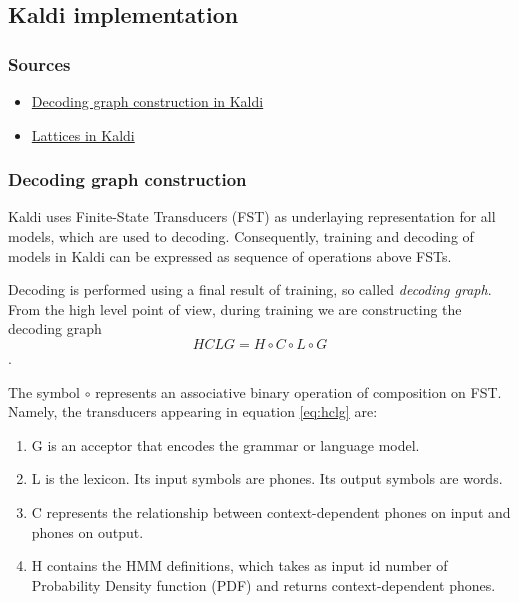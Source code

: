 
\subsection{Kaldi implementation} %
\label{sec:kaldi}


\subsubsection*{Sources} %

\begin{itemize}
    \item \href{http://kaldi.sourceforge.net/graph.html} {Decoding graph construction in Kaldi}
    \item \href{http://kaldi.sourceforge.net/lattices.html} {Lattices in Kaldi}
\end{itemize}

\subsubsection*{Decoding graph construction} %
Kaldi uses Finite-State Transducers (FST) as underlaying representation for all models, which are used to decoding. Consequently, training and decoding of models in Kaldi can be expressed as sequence of operations above FSTs.

Decoding is performed using a final result of training, so called {\it decoding graph}. 
From the high level point of view,
during training we are constructing the decoding graph 
\begin{equation} \label{eq:hclg}
HCLG = H\circ C\circ L\circ G
\end{equation}.

The symbol $\circ$ represents an associative binary operation of composition on FST.
Namely, the transducers appearing in equation \ref{eq:hclg} are:
\begin{enumerate}
    \item G is an acceptor that encodes the grammar or language model.
    \item L is the lexicon. Its input symbols are phones. Its output symbols are words.
    \item C represents the relationship between context-dependent phones on input and phones on output.
    \item H contains the HMM definitions, which takes as input id number of Probability Density function (PDF) and returns context-dependent phones.
\end{enumerate}

